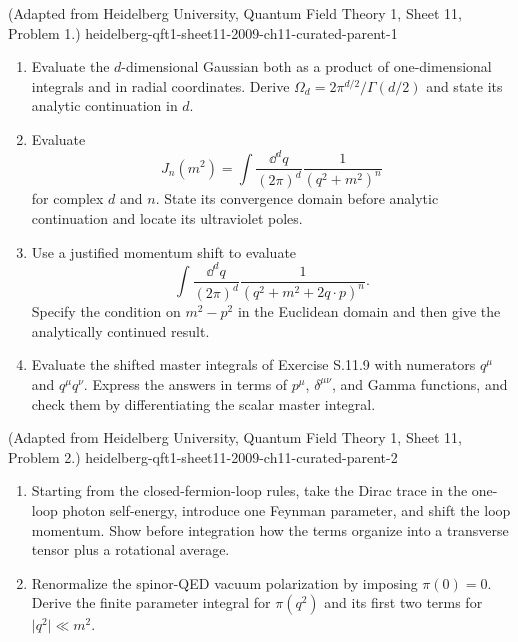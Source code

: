 \begin{enumerate}
  {(Adapted from Heidelberg University, Quantum Field Theory 1, Sheet 11, Problem 1.)}
  {heidelberg-qft1-sheet11-2009-ch11-curated-parent-1}
\begin{enumerate}
\item
Evaluate the \(d\)-dimensional Gaussian both as a product of one-dimensional
integrals and in radial coordinates.  Derive
\(\Omega_d=2\pi^{d/2}/\Gamma(d/2)\) and state its analytic continuation in
\(d\).
\item
Evaluate
\[
 J_n(m^2)=\int\frac{\dd^dq}{(2\pi)^d}\frac{1}{(q^2+m^2)^n}
\]
for complex \(d\) and \(n\).  State its convergence domain before analytic
continuation and locate its ultraviolet poles.
\item
Use a justified momentum shift to evaluate
\[
 \int\frac{\dd^dq}{(2\pi)^d}
 \frac{1}{(q^2+m^2+2q\cdot p)^n}.
\]
Specify the condition on \(m^2-p^2\) in the Euclidean domain and then give
the analytically continued result.
\item
Evaluate the shifted master integrals of Exercise S.11.9 with numerators
\(q^\mu\) and \(q^\mu q^\nu\).  Express the answers in terms of \(p^\mu\),
\(\delta^{\mu\nu}\), and Gamma functions, and check them by differentiating
the scalar master integral.
\end{enumerate}

  {(Adapted from Heidelberg University, Quantum Field Theory 1, Sheet 11, Problem 2.)}
  {heidelberg-qft1-sheet11-2009-ch11-curated-parent-2}
\begin{enumerate}
\item
Starting from the closed-fermion-loop rules, take the Dirac trace in the
one-loop photon self-energy, introduce one Feynman parameter, and shift the
loop momentum.  Show before integration how the terms organize into a
transverse tensor plus a rotational average.
\item
Renormalize the spinor-QED vacuum polarization by imposing \(\pi(0)=0\).
Derive the finite parameter integral for \(\pi(q^2)\) and its first two
terms for \(\lvert q^2\rvert\ll m^2\).
\end{enumerate}


\end{enumerate}
